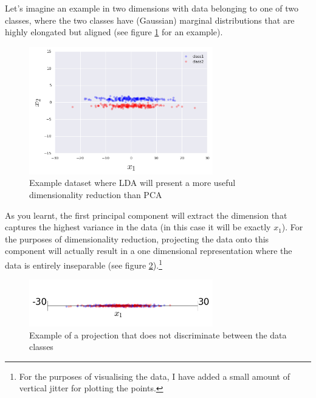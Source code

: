\documentclass{article}
\begin{document}
Let's imagine an example in two dimensions with data belonging to one of two classes, where the two classes have (Gaussian) marginal distributions that are highly elongated but aligned (see figure \ref{fig:lda_vs_pcs_ex} for an example).
\begin{figure}[h]
\center
\includegraphics[width=8cm]{lda_vs_pcs_ex}
\caption{Example dataset where LDA will present a more useful dimensionality reduction than PCA}\label{fig:lda_vs_pcs_ex}
\end{figure}
As you learnt, the first principal component will extract the dimension that captures the highest variance in the data (in this case it will be exactly $x_1$). For the purposes of dimensionality reduction, projecting the data onto this component will actually result in a one dimensional representation where the data is entirely inseparable (see figure \ref{fig:pca_projection}).\footnote{For the purposes of visualising the data, I have added a small amount of vertical jitter for plotting the points.}

\begin{figure}[h]
\center
\includegraphics[width=8cm]{pca_projection}
\caption{Example of a projection that does not discriminate between the data classes}\label{fig:pca_projection}
\end{figure}
\end{document}
